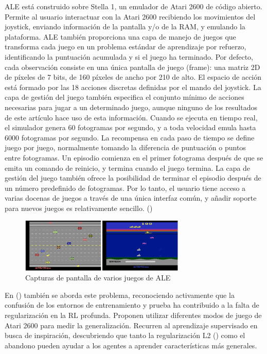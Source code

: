 ALE está construido sobre Stella 1, un emulador de Atari 2600 de código abierto. Permite al usuario interactuar con la Atari 2600 recibiendo los movimientos del joystick, enviando información de la pantalla y/o de la RAM, y emulando la plataforma. ALE también proporciona una capa de manejo de juegos que transforma cada juego en un problema estándar de aprendizaje por refuerzo, identificando la puntuación acumulada y si el juego ha terminado. Por defecto, cada observación consiste en una única pantalla de juego (frame): una matriz 2D de píxeles de 7 bits, de 160 píxeles de ancho por 210 de alto. El espacio de acción está formado por las 18 acciones discretas definidas por el mando del joystick. La capa de gestión del juego también especifica el conjunto mínimo de acciones necesarias para jugar a un determinado juego, aunque ninguno de los resultados de este artículo hace uso de esta información. Cuando se ejecuta en tiempo real, el simulador genera 60 fotogramas por segundo, y a toda velocidad emula hasta 6000 fotogramas por segundo. La recompensa en cada paso de tiempo se define juego por juego, normalmente tomando la diferencia de puntuación o puntos entre fotogramas. Un episodio comienza en el primer fotograma después de que se emita un comando de reinicio, y termina cuando el juego termina. La capa de gestión del juego también ofrece la posibilidad de terminar el episodio después de un número predefinido de fotogramas. Por lo tanto, el usuario tiene acceso a varias docenas de juegos a través de una única interfaz común, y añadir soporte para nuevos juegos es relativamente sencillo. (\cite{bellemare2013arcade})

\begin{figure}[ht!]
    \centering
    \includegraphics[width=0.7\textwidth]{Graphics/ale.png}
    \caption{Capturas de pantalla de varios juegos de ALE}
    \label{fig:ale}
\end{figure}

En (\cite{farebrother2018generalization}) también se aborda este problema, reconociendo activamente que la confusión de los entornos de entrenamiento y prueba ha contribuido a la falta de regularización en la RL profunda. Proponen utilizar diferentes modos de juego de Atari 2600 para medir la generalización. Recurren al aprendizaje supervisado en busca de inspiración, descubriendo que tanto la regularización L2 (\cite{krogh1991simple}) como el abandono pueden ayudar a los agentes a aprender características más generales.

